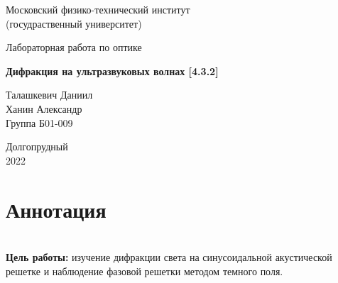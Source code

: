 \documentclass[a4paper, 12pt]{article}%
\begin{document}
\begin{titlepage}

	\newpage
	\begin{center}
		\normalsize Московский физико-технический институт \\(госудраственный 			университет)
	\end{center}

	\vspace{6em}

	\begin{center}
		\Large Лабораторная работа по оптике\\
	\end{center}

	\vspace{1em}

	\begin{center}
		\large \textbf{Дифракция на ультразвуковых волнах [4.3.2]}
	\end{center}

	\vspace{2em}

	\begin{center}
		\large Талашкевич Даниил\\
		\large Ханин Александр \\
		Группа Б01-009
	\end{center}

	\vspace{\fill}

	\begin{center}
	Долгопрудный \\2022
	\end{center}
	
\end{titlepage}



	\thispagestyle{empty}
	\newpage
	\tableofcontents
	\newpage
	\setcounter{page}{1}
	
	\section{Аннотация}	

$ $\\

	\textbf{Цель работы:} изучение дифракции света на синусоидальной акустической решетке и наблюдение фазовой решетки методом темного поля.
	
\end{document}
